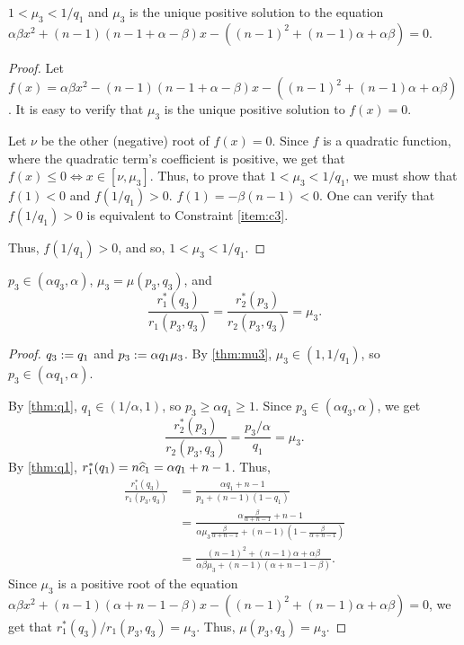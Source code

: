 \begin{lemma}
\label{thm:mu3}
$1 < \mu_3 < 1/q_1$ and
$\mu_3$ is the unique positive solution to the equation
$\alpha\beta x^2 + (n-1)(n-1+\alpha-\beta)x - ((n-1)^2 + (n-1)\alpha + \alpha\beta) = 0$.
\end{lemma}
\begin{proof}
Let $f(x) = \alpha\beta x^2 - (n-1)(n-1+\alpha-\beta)x - ((n-1)^2 + (n-1)\alpha + \alpha\beta)$.
It is easy to verify that $\mu_3$ is the unique positive solution to $f(x) = 0$.

Let $\nu$ be the other (negative) root of $f(x) = 0$.
Since $f$ is a quadratic function, where the quadratic term's coefficient is positive,
we get that $f(x) \le 0 \iff x \in [\nu, \mu_3]$.
Thus, to prove that $1 < \mu_3 < 1/q_1$,
we must show that $f(1) < 0$ and $f(1/q_1) > 0$.
$f(1) = -\beta(n-1) < 0$.
One can verify that $f(1/q_1) > 0$ is equivalent to Constraint \ref{item:c3}.

Thus, $f(1/q_1) > 0$, and so, $1 < \mu_3 < 1/q_1$.
\end{proof}

\begin{lemma}
\label{thm:p3}
$p_3 \in (\alpha q_3, \alpha)$, $\mu_3 = \mu(p_3, q_3)$, and
\[ \frac{r_1^*(q_3)}{r_1(p_3, q_3)} = \frac{r_2^*(p_3)}{r_2(p_3, q_3)} = \mu_3. \]
\end{lemma}
\begin{proof}
$q_3 := q_1$ and $p_3 := \alpha q_1 \mu_3$.
By \cref{thm:mu3}, $\mu_3 \in (1, 1/q_1)$, so $p_3 \in (\alpha q_1, \alpha)$.

By \cref{thm:q1}, $q_1 \in (1/\alpha, 1)$, so $p_3 \ge \alpha q_1 \ge 1$.
Since $p_3 \in (\alpha q_3, \alpha)$, we get
\[ \frac{r_2^*(p_3)}{r_2(p_3, q_3)} = \frac{p_3/\alpha}{q_1} = \mu_3. \]
By \cref{thm:q1}, $r_1^*(q_1) = n\widehat{c}_1 = \alpha q_1 + n-1$. Thus,
\begin{align*}
\frac{r_1^*(q_3)}{r_1(p_3, q_3)} &= \frac{\alpha q_1 + n-1}{p_3 + (n-1)(1-q_1)}
\\ &= \frac{\alpha\frac{\beta}{\alpha+n-1} + n-1}{\alpha \mu_3 \frac{\beta}{\alpha+n-1}
    + (n-1)\left(1 - \frac{\beta}{\alpha + n-1}\right)}
\\ &= \frac{(n-1)^2 + (n-1)\alpha + \alpha\beta}{\alpha\beta\mu_3 + (n-1)(\alpha + n-1 - \beta)}.
\end{align*}
Since $\mu_3$ is a positive root of the equation
$\alpha\beta x^2 + (n-1)(\alpha + n-1 - \beta)x - ((n-1)^2 + (n-1)\alpha + \alpha\beta) = 0$,
we get that $r_1^*(q_3)/r_1(p_3, q_3) = \mu_3$.
Thus, $\mu(p_3, q_3) = \mu_3$.
\end{proof}

